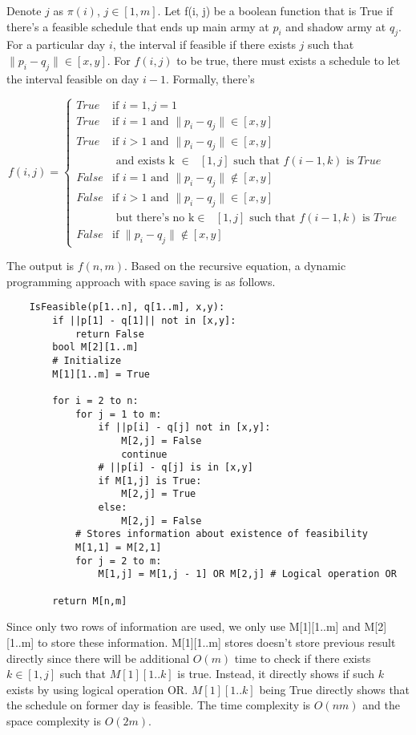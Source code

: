 \documentclass[12pt,a4paper]{article}
\begin{document}
Denote $j$ as $\pi(i)$, $j \in [1,m]$. Let f(i, j) be a boolean function that is True if there's a feasible schedule that ends up main army at $p_i$ and shadow army at $q_j$. For a particular day $i$, the interval if feasible if there exists $j$ such that $\|p_i - q_j\| \in [x,y]$. For $f(i,j)$ to be true, there must exists a schedule to let the interval feasible on day $i - 1$. Formally, there's 

\begin{equation*}
f(i, j) = 
	\begin{cases}
	True & \mbox{if } i = 1, j = 1 \\
	True & \mbox{if } i = 1 \mbox{ and } \|p_i - q_j\| \in [x,y] \\
	True & \mbox{if } i > 1 \mbox{ and }\|p_i - q_j\| \in [x,y] \\
		& \mbox{ and exists k $\in$ $[1,j]$ such that $f(i - 1, k)$ is $True$} \\
	False & \mbox{if } i = 1 \mbox{ and } \|p_i - q_j\| \notin [x,y] \\
	False & \mbox{if }  i > 1 \mbox{ and } \|p_i - q_j\| \in [x,y] \\
		& \mbox{ but there's no k$\in$ $[1,j]$ such that $f(i - 1, k)$ is $True$ } \\
	False & \mbox{if } \|p_i - q_j\| \notin [x,y]
	\end{cases}
\end{equation*}

The output is $f(n, m)$. Based on the recursive equation, a dynamic programming approach with space saving is as follows.

\begin{lstlisting}
	IsFeasible(p[1..n], q[1..m], x,y):
		if ||p[1] - q[1]|| not in [x,y]:
			return False
		bool M[2][1..m] 
		# Initialize
		M[1][1..m] = True

		for i = 2 to n:
			for j = 1 to m:
				if ||p[i] - q[j] not in [x,y]:
					M[2,j] = False
					continue
				# ||p[i] - q[j] is in [x,y]
				if M[1,j] is True:
					M[2,j] = True
				else:
					M[2,j] = False
			# Stores information about existence of feasibility
			M[1,1] = M[2,1]
			for j = 2 to m:
				M[1,j] = M[1,j - 1] OR M[2,j] # Logical operation OR

		return M[n,m]	
\end{lstlisting}

Since only two rows of information are used, we only use M[1][1..m] and M[2][1..m] to store these information. M[1][1..m] stores doesn't store previous result directly since there will be additional $O(m)$ time to check if there exists $k \in [1,j]$ such that $M[1][1..k]$ is true. Instead, it directly shows if such $k$ exists by using logical operation OR. $M[1][1..k]$ being True directly shows that the schedule on former day is feasible. The time complexity is $O(nm)$ and the space complexity is $O(2m)$.
\end{document}
